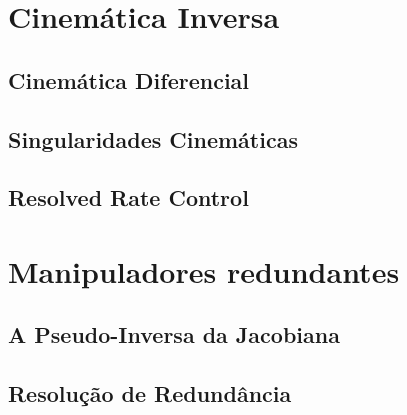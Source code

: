 \section{Cinemática Inversa}

\subsection{Cinemática Diferencial}

\subsection{Singularidades Cinemáticas}

\subsection{Resolved Rate Control}

\section{Manipuladores redundantes}

\subsection{A Pseudo-Inversa da Jacobiana}

\subsection{Resolução de Redundância}

